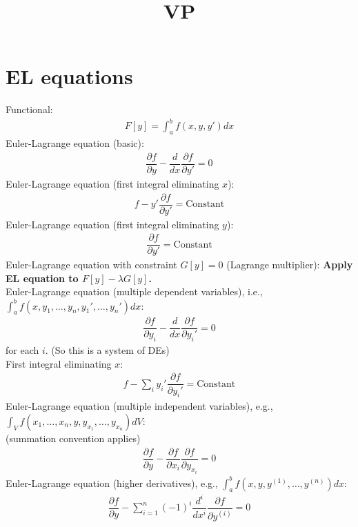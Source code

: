 \documentclass{article}
\title{VP}
\author{ }
\date{ }
\theoremstyle{definition}
\theoremstyle{remark}
\theoremstyle{plain}
\begin{document}
\maketitle

\section{EL equations}
Functional:
\begin{align}
    F[y]=\int_a^b f(x,y,y')dx
\end{align}
Euler-Lagrange equation (basic):
\begin{align*}
    \dfrac{\partial f}{\partial y}-\dfrac{d}{dx}\dfrac{\partial f}{\partial y'}=0
\end{align*}
Euler-Lagrange equation (first integral eliminating $x$):
\begin{align*}
    f-y'\dfrac{\partial f}{\partial y'}=\text{Constant}
\end{align*}
Euler-Lagrange equation (first integral eliminating $y$):
\begin{align*}
    \dfrac{\partial f}{\partial y'}=\text{Constant}
\end{align*}
Euler-Lagrange equation with constraint $G[y]=0$ (Lagrange multiplier): \textbf{Apply EL equation to $F[y]-\lambda G[y]$.}\\
Euler-Lagrange equation (multiple dependent variables), i.e., $\int_a^b f(x,y_1,\ldots,y_n, y_1',\ldots,y_n')dx$: 
\begin{align*}
    \dfrac{\partial f}{\partial y_i}-\dfrac{d}{dx}\dfrac{\partial f}{\partial y_i'}=0
\end{align*}
for each $i$. (So this is a system of DEs)\\
First integral eliminating $x$:
\begin{align*}
    f-\sum_iy_i'\dfrac{\partial f}{\partial y_i'}=\text{Constant}
\end{align*}
Euler-Lagrange equation (multiple independent variables), e.g., $\int_V f(x_1,\ldots,x_n,y,y_{x_1},\ldots,y_{x_n})dV$:\\
(summation convention applies)
\begin{align*}
    \dfrac{\partial f}{\partial y}-\dfrac{\partial f}{\partial x_i}\dfrac{\partial f}{\partial y_{x_i}}=0
\end{align*}
Euler-Lagrange equation (higher derivatives), e.g., $\int_a^b f(x,y,y^{(1)},\ldots,y^{(n)})dx$:
\begin{align*}
    \dfrac{\partial f}{\partial y}-\sum_{i=1}^n(-1)^i\dfrac{d^i}{dx^i}\dfrac{\partial f}{\partial y^{(i)}}=0
\end{align*}
\end{document}

